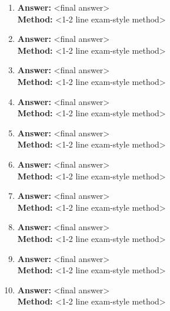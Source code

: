 \documentclass[11pt,a4paper]{article}
\begin{document}
\vspace{3mm}
\begin{enumerate}
  \item \textbf{Answer:} <final answer> \\
  \textbf{Method:} <1-2 line exam-style method>

  \item \textbf{Answer:} <final answer> \\
  \textbf{Method:} <1-2 line exam-style method>

  \item \textbf{Answer:} <final answer> \\
  \textbf{Method:} <1-2 line exam-style method>

  \item \textbf{Answer:} <final answer> \\
  \textbf{Method:} <1-2 line exam-style method>

  \item \textbf{Answer:} <final answer> \\
  \textbf{Method:} <1-2 line exam-style method>

  \item \textbf{Answer:} <final answer> \\
  \textbf{Method:} <1-2 line exam-style method>

  \item \textbf{Answer:} <final answer> \\
  \textbf{Method:} <1-2 line exam-style method>

  \item \textbf{Answer:} <final answer> \\
  \textbf{Method:} <1-2 line exam-style method>

  \item \textbf{Answer:} <final answer> \\
  \textbf{Method:} <1-2 line exam-style method>

  \item \textbf{Answer:} <final answer> \\
  \textbf{Method:} <1-2 line exam-style method>
\end{enumerate}
\end{document}
